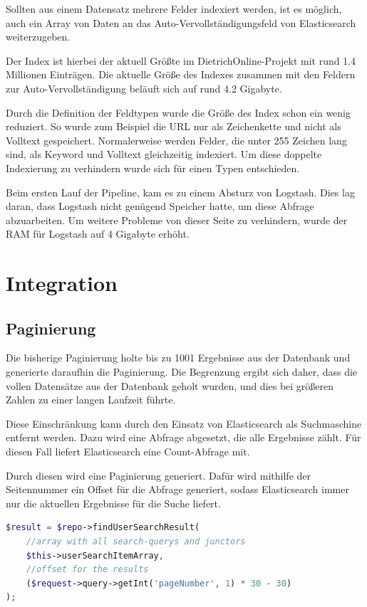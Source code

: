 Sollten aus einem Datensatz mehrere Felder indexiert werden, ist es möglich, auch ein Array von Daten an das Auto-Vervollständigungsfeld von Elasticsearch weiterzugeben.

Der Index ist hierbei der aktuell Größte im DietrichOnline-Projekt mit rund 1.4 Millionen Einträgen. Die aktuelle Größe des Indexes zusammen mit den Feldern zur Auto-Vervollständigung beläuft sich auf rund 4.2 Gigabyte. 

Durch die Definition der Feldtypen wurde die Größe des Index schon ein wenig reduziert. So wurde zum Beispiel die URL nur als Zeichenkette und nicht als Volltext gespeichert. Normalerweise werden Felder, die unter 255 Zeichen lang sind, als Keyword und Volltext gleichzeitig indexiert. Um diese doppelte Indexierung zu verhindern wurde sich für einen Typen entschieden.

Beim ersten Lauf der Pipeline, kam es zu einem Absturz von Logstash. Dies lag daran, dass Logstash nicht genügend Speicher hatte, um diese Abfrage abzuarbeiten. Um weitere Probleme von dieser Seite zu verhindern, wurde der RAM für Logstash auf 4 Gigabyte erhöht.

\section{Integration}

\subsection{Paginierung}

Die bisherige Paginierung holte bis zu 1001 Ergebnisse aus der Datenbank und generierte daraufhin die Paginierung. Die Begrenzung ergibt sich daher, dass die vollen Datensätze aus der Datenbank geholt wurden, und dies bei größeren Zahlen zu einer langen Laufzeit führte.

Diese Einschränkung kann durch den Einsatz von Elasticsearch als Suchmaschine entfernt werden. Dazu wird eine Abfrage abgesetzt, die alle Ergebnisse zählt. Für diesen Fall liefert Elasticsearch eine Count-Abfrage mit.

Durch diesen wird eine Paginierung generiert. Dafür wird mithilfe der Seitennummer ein Offset für die Abfrage generiert, sodass Elasticsearch immer nur die aktuellen Ergebnisse für die Suche liefert.

\begin{lstlisting}[language=PHP, frame=single, label={lst:generierung},  caption=Generierung des Offsets für die Paginierung,captionpos=b] 
$result = $repo->findUserSearchResult(
    //array with all search-querys and junctors
    $this->userSearchItemArray, 
    //offset for the results
    ($request->query->getInt('pageNumber', 1) * 30 - 30)
);
\end{lstlisting}

